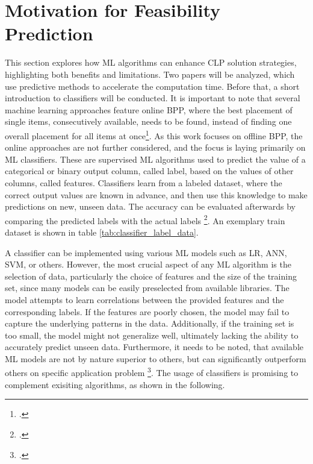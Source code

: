 \chapter{Motivation for Feasibility Prediction}
\label{sec:motivation_feasibility_prediction}
This section explores how \gls{ML} algorithms can enhance \gls{CLP} solution strategies,
highlighting both benefits and limitations. Two papers will be
analyzed, which use predictive methods to accelerate the computation time. Before that,
a short introduction to classifiers will be conducted. It is important to note that
several machine learning approaches feature
online \gls{BPP}, where the best placement of single items, consecutively available,
needs to be found, instead of finding one overall placement for all items at once\footcite[cf.][p. 1]{ali_-line_2022}. As this work focuses on offline
\gls{BPP}, the online approaches are not further considered, and the focus is laying
primarily on \gls{ML} classifiers. These are supervised \gls{ML} algorithms used to predict the
value of a categorical or binary output column, called label, based on the
values of other columns, called features. Classifiers learn from a labeled dataset,
where the correct output values are known in advance, and then use this knowledge to
make predictions on new, unseen data. The accuracy can be evaluated afterwards by comparing
the predicted labels with the actual labels \footcite[cf.][]{kotsiantis_supervised_2007}.
An exemplary train dataset is shown in table \ref{tab:classifier_label_data}.



A classifier can be implemented using various \gls{ML} models such as \gls{LR},
\gls{ANN}, \gls{SVM}, or others. However, the most crucial aspect of any
\gls{ML} algorithm is the selection of data, particularly the choice of features and
the size of the training set, since many models can be easily preselected from available
libraries. The model attempts to learn correlations between the provided features
and the corresponding labels. If the features are poorly chosen, the model may fail
to capture the underlying patterns in the data. Additionally, if the training set
is too small, the model might not generalize well, ultimately lacking the ability
to accurately predict unseen data. Furthermore, it needs to be noted, that available
\gls{ML} models are not by nature superior to others, but can significantly outperform
others on specific application problem \footcite[cf.][pp. 250, 264]{kotsiantis_supervised_2007}.
The usage of classifiers is promising to complement exisiting algorithms, as shown in the following.


